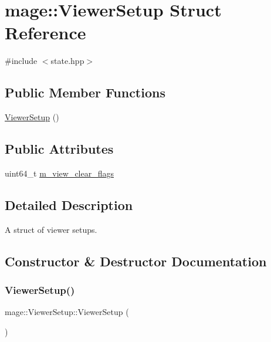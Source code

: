 \hypertarget{structmage_1_1_viewer_setup}{}\section{mage\+:\+:Viewer\+Setup Struct Reference}
\label{structmage_1_1_viewer_setup}


{\ttfamily \#include $<$state.\+hpp$>$}

\subsection*{Public Member Functions}
\begin{DoxyCompactItemize}
\item 
\hyperlink{structmage_1_1_viewer_setup_a41acbd3bd1b8df2e175a57ee9bd07bda}{Viewer\+Setup} ()
\end{DoxyCompactItemize}
\subsection*{Public Attributes}
\begin{DoxyCompactItemize}
\item 
uint64\+\_\+t \hyperlink{structmage_1_1_viewer_setup_aed7b78b5437c46627949142f628c331d}{m\+\_\+view\+\_\+clear\+\_\+flags}
\end{DoxyCompactItemize}


\subsection{Detailed Description}
A struct of viewer setups. 

\subsection{Constructor \& Destructor Documentation}
\hypertarget{structmage_1_1_viewer_setup_a41acbd3bd1b8df2e175a57ee9bd07bda}{}\label{structmage_1_1_viewer_setup_a41acbd3bd1b8df2e175a57ee9bd07bda} 
\subsubsection{\texorpdfstring{Viewer\+Setup()}{ViewerSetup()}}
{\footnotesize\ttfamily mage\+::\+Viewer\+Setup\+::\+Viewer\+Setup (\begin{DoxyParamCaption}{ }\end{DoxyParamCaption})}

